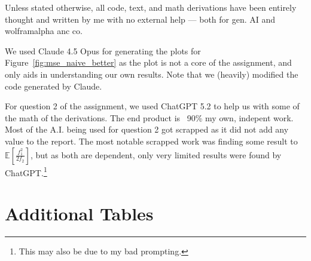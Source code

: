 \documentclass{article}
\begin{document}
Unless stated otherwise, all code, text, and math derivations have been entirely thought and written by me with no external help --- both for gen. AI and wolframalpha anc co.

We used Claude 4.5 Opus for generating the plots for Figure~\ref{fig:mse_naive_better} as the plot is not a core of the assignment, and only aids in understanding our own results. Note that we (heavily) modified the code generated by Claude.

For question 2 of the assignment, we used ChatGPT 5.2 to help us with some of the math of the derivations. The end product is ~90\% my own, indepent work. 
Most of the A.I. being used for question 2 got scrapped as it did not add any value to the report. The most notable scrapped work was finding some result to $\mathbb{E}\left[ \frac{f_1^2}{2f_2} \right]$, but as both are dependent, only very limited results were found by ChatGPT.\!\footnote{This may also be due to my bad prompting.}




\appendix
\section*{Additional Tables}
\end{document}
